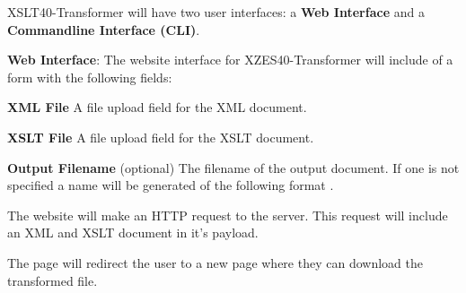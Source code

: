 XSLT40-Transformer will have two user interfaces: a \textbf{Web Interface} and a \textbf{Commandline Interface (CLI)}.

\begin{description}
    \item {
        \textbf{Web Interface}:
        The website interface for XZES40-Transformer will include of a form with the following fields:
        \begin{description}
            \item {
              \textbf{XML File} A file upload field for the XML document.
            }
            \item {
              \textbf{XSLT File} A file upload field for the XSLT document.
            }
            \item {
              \textbf{Output Filename} (optional)
              The filename of the output document.
              If one is not specified a name will be generated of the following format .
            }
        \end{description}

        The website will make an HTTP  request to the server.
        This  request will include an XML and XSLT document in it's payload.

        The page will redirect the user to a new page where they can download the transformed file.

}
\end{description}
